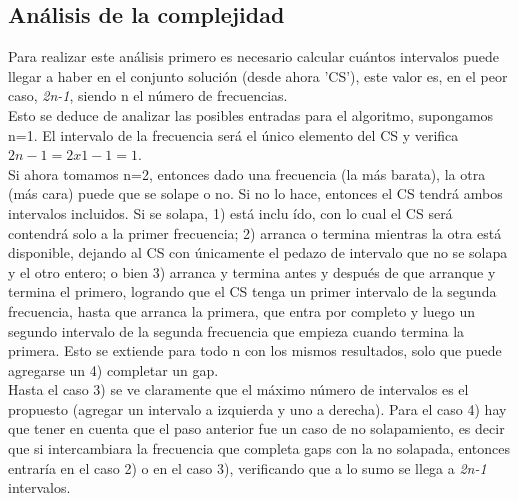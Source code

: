 

\newpage

\subsection{An\'alisis de la complejidad}

Para realizar este análisis primero es necesario calcular cu\'antos intervalos puede llegar a haber en el conjunto soluci\'on (desde ahora 'CS'), este valor es, en el peor caso, \emph{2n-1}, siendo n el n\'umero de frecuencias.\\

Esto se deduce de analizar las posibles entradas para el algoritmo, supongamos n=1. El intervalo de la frecuencia ser\'a el \'unico elemento del CS y verifica $2n-1=2x1-1=1$.\\

Si ahora tomamos n=2, entonces dado una frecuencia (la m\'as barata), la otra (m\'as cara) puede que se solape o no. Si no lo hace, entonces el CS tendr\'a ambos intervalos incluidos. Si se solapa, 1) est\'a inclu \'ido, con lo cual el CS ser\'a contendr\'a solo a la primer frecuencia; 2) arranca o termina mientras la otra est\'a disponible, dejando al CS con \'unicamente el pedazo de intervalo que no se solapa y el otro entero; o bien 3) arranca y termina antes y despu\'es de que arranque y termina el primero, logrando que el CS tenga un primer intervalo de la segunda frecuencia, hasta que arranca la primera, que entra por completo y luego un segundo intervalo de la segunda frecuencia que empieza cuando termina la primera. Esto se extiende para todo n con los mismos resultados, solo que puede agregarse un 4) completar un gap.\\

Hasta el caso 3) se ve claramente que el m\'aximo n\'umero de intervalos es el propuesto (agregar un intervalo a izquierda y uno a derecha). Para el caso 4) hay que tener en cuenta que el paso anterior fue un caso de no solapamiento, es decir que si intercambiara la frecuencia que completa gaps con la no solapada, entonces entrar\'ia en el caso 2) o en el caso 3), verificando que a lo sumo se llega a \emph{2n-1} intervalos.\\

